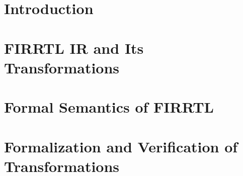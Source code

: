 \documentclass[acmsmall,review,anonymous]{acmart}%
\newcommand{\zhilin}[1]{\color{brown} {ZL: #1 :LZ} \color{black}}
\newcommand{\zhilin}[1]{}
\begin{document}


\section{Introduction} \label{sec-intro}



\section{FIRRTL IR and Its Transformations}\label{sec-firrtl}




\section{Formal Semantics of FIRRTL}\label{sec-form-firrtl}




%





\section{Formalization and Verification of {\hifirrtl} Transformations}\label{sec-form-verif-transform}

%
%

\end{document}
